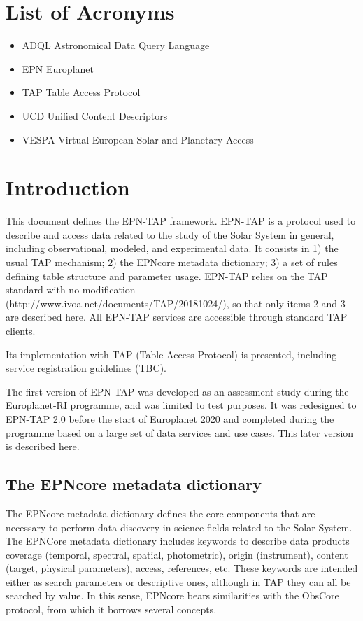 \documentclass[11pt,a4paper]{ivoa}
\begin{document}
\section*{List of Acronyms}
\begin{itemize}
\item{ADQL} Astronomical Data Query Language
\item{EPN} Europlanet
\item{TAP} Table Access Protocol 
\item{UCD} Unified Content Descriptors
\item{VESPA} Virtual European Solar and Planetary Access
\end{itemize}

\section{Introduction}


This document defines the EPN-TAP framework. EPN-TAP is a protocol used to describe and access data related to the study of the Solar System in general, including observational, modeled, and experimental data. It consists in 1) the usual TAP mechanism; 2) the EPNcore metadata dictionary; 3) a set of rules defining table structure and parameter usage. EPN-TAP relies on the TAP standard with no modification (http://www.ivoa.net/documents/TAP/20181024/), so that only items 2 and 3 are described here. All EPN-TAP services are accessible through standard TAP clients. 

Its implementation with TAP (Table Access Protocol) is presented, including service registration guidelines (TBC). 

The first version of EPN-TAP was developed as an assessment study during the Europlanet-RI programme, and was limited to test purposes. It was redesigned to EPN-TAP 2.0 before the start of Europlanet 2020 and completed during the programme based on a large set of data services and use cases. This later version is described here.


\subsection{The EPNcore metadata dictionary}

The EPNcore metadata dictionary defines the core components that are necessary to perform data discovery in science fields related to the Solar System. The EPNCore metadata dictionary includes keywords to describe data products coverage (temporal, spectral, spatial, photometric), origin (instrument), content (target, physical parameters), access, references, etc. These keywords are intended either as search parameters or descriptive ones, although in TAP they can all be searched by value. In this sense, EPNcore bears similarities with the ObsCore protocol, from which it borrows several concepts. 
\end{document}
